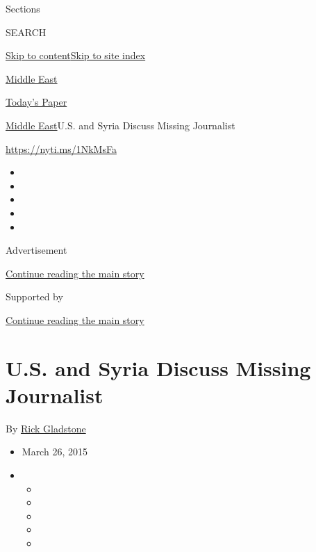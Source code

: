 Sections

SEARCH

\protect\hyperlink{site-content}{Skip to
content}\protect\hyperlink{site-index}{Skip to site index}

\href{https://www.nytimes3xbfgragh.onion/section/world/middleeast}{Middle
East}

\href{https://myaccount.nytimes3xbfgragh.onion/auth/login?response_type=cookie\&client_id=vi}{}

\href{https://www.nytimes3xbfgragh.onion/section/todayspaper}{Today's
Paper}

\href{/section/world/middleeast}{Middle East}\textbar{}U.S. and Syria
Discuss Missing Journalist

\url{https://nyti.ms/1NkMsFa}

\begin{itemize}
\item
\item
\item
\item
\item
\end{itemize}

Advertisement

\protect\hyperlink{after-top}{Continue reading the main story}

Supported by

\protect\hyperlink{after-sponsor}{Continue reading the main story}

\hypertarget{us-and-syria-discuss-missing-journalist}{%
\section{U.S. and Syria Discuss Missing
Journalist}\label{us-and-syria-discuss-missing-journalist}}

By \href{https://www.nytimes3xbfgragh.onion/by/rick-gladstone}{Rick
Gladstone}

\begin{itemize}
\item
  March 26, 2015
\item
  \begin{itemize}
  \item
  \item
  \item
  \item
  \item
  \end{itemize}
\end{itemize}

